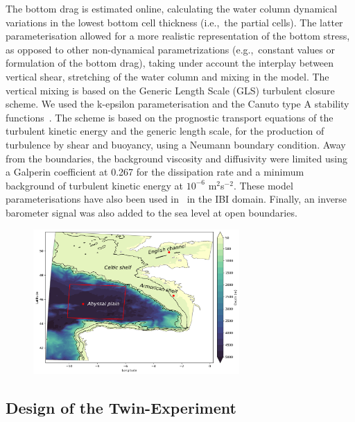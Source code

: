 \documentclass[jmse,article,accept,moreauthors,pdftex]{Definitions/mdpi}
\begin{document}
The bottom drag is estimated online, calculating the water column dynamical variations in the lowest bottom cell thickness (i.e.,~the partial cells). The latter parameterisation allowed for a more realistic representation of the bottom stress, as opposed to other non-dynamical parametrizations (e.g.,~constant values or formulation of the bottom drag), taking under account the interplay between vertical shear, stretching of the water column and mixing in the model. The vertical mixing is based on the Generic Length Scale (GLS) turbulent closure scheme. We used the k-epsilon parameterisation and the Canuto type A stability functions~\cite{Umlauf2003,UMLAUF2005}. The scheme is based on the prognostic transport equations of the turbulent kinetic energy and the generic length scale, for the production of turbulence by shear and buoyancy, using a Neumann boundary condition. Away from the boundaries, the background viscosity and diffusivity were limited using a Galperin coefficient at 0.267 for the dissipation rate and a minimum background of turbulent kinetic energy at $10^{-6}$ m$^{2}$s$^{-2}$. These model parameterisations have also been used in~\cite{maraldi2013} in the IBI domain. Finally, an inverse barometer signal was also added to the sea level at open boundaries.

\begin{figure}[H]
    \centering
    \includegraphics[width=0.7\textwidth]{Definitions/figure1.png}
    \caption{}
    \label{fig:bathymetry}
\end{figure}

\subsection{Design of the Twin-Experiment}
\label{section:2.2}
\end{document}
